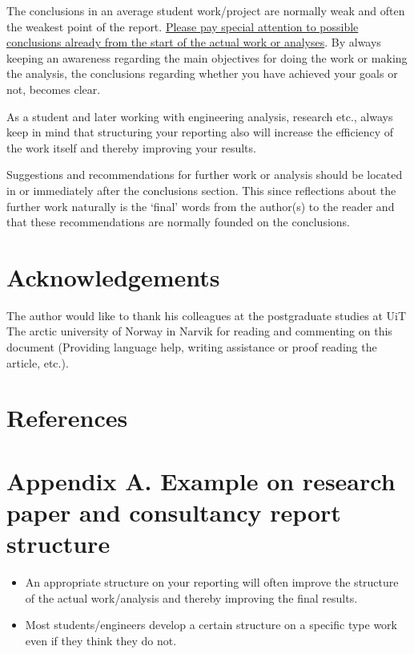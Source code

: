 \documentclass[a4paper,12pt]{extarticle}
\begin{document}
The conclusions in an average student work/project are normally weak and often the weakest point of the report. \ul{Please pay special attention to possible conclusions already from the start of the actual work or analyses}. By always keeping an awareness regarding the main objectives for doing the work or making the analysis, the conclusions regarding whether you have achieved your goals or not, becomes clear.

As a student and later working with engineering analysis, research etc., always keep in mind that structuring your reporting also will increase the efficiency of the work itself and thereby improving your results.

Suggestions and recommendations for further work or analysis should be located in or immediately after the conclusions section. This since reflections about the further work naturally is the ‘final’ words from the author(s) to the reader and that these recommendations are normally founded on the conclusions. 

\section{Acknowledgements}
The author would like to thank his colleagues at the postgraduate studies at UiT The arctic university of Norway in Narvik for reading and commenting on this document (Providing language help, writing assistance or proof reading the article, etc.).

\section{References}
\begingroup
\def\section*#1{}


\endgroup

\pagebreak
\appendix
\section{Appendix A. Example on research paper and consultancy report structure}
\begin{itemize}
  \item An appropriate structure on your reporting will often improve the structure of the actual work/analysis and thereby improving the final results.
  \item Most students/engineers develop a certain structure on a specific type work even if they think they do not.
\end{itemize}
\end{document}
